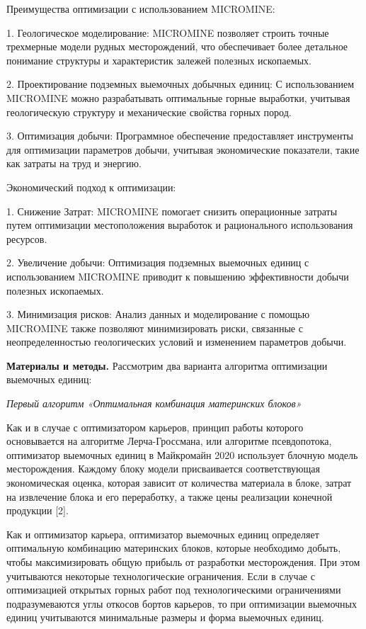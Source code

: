 Преимущества оптимизации с использованием MICROMINE:

1. Геологическое моделирование: MICROMINE позволяет строить точные
трехмерные модели рудных месторождений, что обеспечивает более детальное
понимание структуры и характеристик залежей полезных ископаемых.

2. Проектирование подземных выемочных добычных единиц: С использованием
MICROMINE можно разрабатывать оптимальные горные выработки, учитывая
геологическую структуру и механические свойства горных пород.

3. Оптимизация добычи: Программное обеспечение предоставляет инструменты
для оптимизации параметров добычи, учитывая экономические показатели,
такие как затраты на труд и энергию.

Экономический подход к оптимизации:

1. Снижение Затрат: MICROMINE помогает снизить операционные затраты
путем оптимизации местоположения выработок и рационального использования
ресурсов.

2. Увеличение добычи: Оптимизация подземных выемочных единиц с
использованием MICROMINE приводит к повышению эффективности добычи
полезных ископаемых.

3. Минимизация рисков: Анализ данных и моделирование с помощью MICROMINE
также позволяют минимизировать риски, связанные с неопределенностью
геологических условий и изменением параметров добычи.

{\bfseries Материалы и методы.} Рассмотрим два варианта алгоритма
оптимизации выемочных единиц:

\emph{Первый алгоритм «Оптимальная комбинация материнских блоков»}

Как и в случае с оптимизатором карьеров, принцип работы которого
основывается на алгоритме Лерча-Гроссмана, или алгоритме псевдопотока,
оптимизатор выемочных единиц в Майкромайн 2020 использует блочную модель
месторождения. Каждому блоку модели присваивается соответствующая
экономическая оценка, которая зависит от количества материала в блоке,
затрат на извлечение блока и его переработку, а также цены реализации
конечной продукции {[}2{]}.

Как и оптимизатор карьера, оптимизатор выемочных единиц определяет
оптимальную комбинацию материнских блоков, которые необходимо добыть,
чтобы максимизировать общую прибыль от разработки месторождения. При
этом учитываются некоторые технологические ограничения. Если в случае с
оптимизацией открытых горных работ под технологическими ограничениями
подразумеваются углы откосов бортов карьеров, то при оптимизации
выемочных единиц учитываются минимальные размеры и форма выемочных
единиц.

